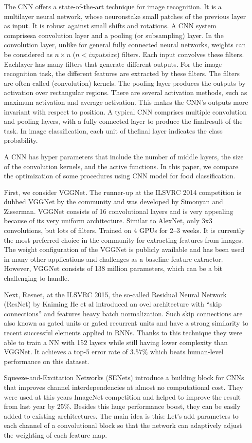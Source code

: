 The CNN offers a state-of-the-art technique for image recognition. It is a multilayer neural network, whose neuronstake small patches of the previous layer as input. It is robust against small shifts and rotations. A CNN system comprisesa convolution layer and a pooling (or subsampling) layer. In the convolution layer, unlike for general fully connected neural networks, weights can be considered as $n \times n$ ($n <input size$) ﬁlters. Each input convolves these ﬁlters. Eachlayer has many ﬁlters that generate diﬀerent outputs. For the image recognition task, the diﬀerent features are extracted by these ﬁlters. The ﬁlters are often called (convolution) kernels. The pooling layer produces the outputs by activation over rectangular regions. There are several activation methods, such as maximum activation and average activation. This makes the CNN’s outputs more invariant with respect to position. A typical CNN comprises multiple convolution and pooling layers, with a fully connected layer to produce the ﬁnalresult of the task. In image classiﬁcation, each unit of theﬁnal layer indicates the class probability.


A CNN has hyper parameters that include the number of middle layers, the size of the convolution kernels, and the active functions. In this paper, we compare the optimization of some procedures using CNN model for food classification.


First, we consider VGGNet. The runner-up at the ILSVRC 2014 competition is dubbed VGGNet by the community and was developed by Simonyan and Zisserman. VGGNet consists of 16 convolutional layers and is very appealing because of its very uniform architecture. Similar to AlexNet, only 3x3 convolutions, but lots of filters. Trained on 4 GPUs for 2–3 weeks. It is currently the most preferred choice in the community for extracting features from images. The weight configuration of the VGGNet is publicly available and has been used in many other applications and challenges as a baseline feature extractor. However, VGGNet consists of 138 million parameters, which can be a bit challenging to handle.

 
Next, Resnet, at the ILSVRC 2015, the so-called Residual Neural Network (ResNet) by Kaiming He et al introduced an ovel architecture with “skip connections” and features heavy batch normalization. Such skip connections are also known as gated units or gated recurrent units and have a strong similarity to recent successful elements applied in RNNs. Thanks to this technique they were able to train a NN with 152 layers while still having lower complexity than VGGNet. It achieves a top-5 error rate of 3.57\% which beats human-level performance on this dataset.


Squeeze-and-Excitation Networks (SENets) introduce a building block for CNNs that improves channel interdependencies at almost no computational cost. They were used at this years ImageNet competition and helped to improve the result from last year by 25\%. Besides this huge performance boost, they can be easily added to existing architectures. The main idea is this: Let’s add parameters to each channel of a convolutional block so that the network can adaptively adjust the weighting of each feature map.